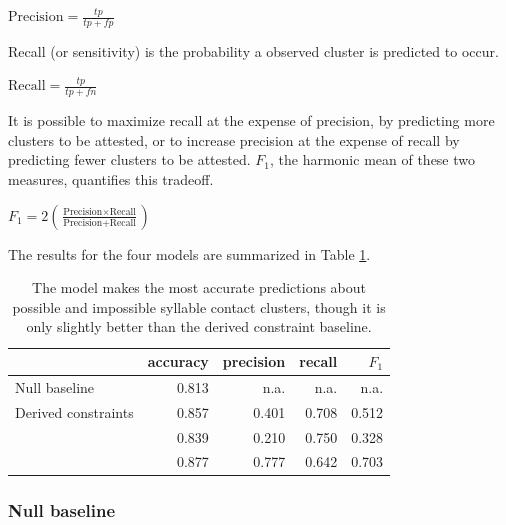 \begin{unlabeledexample}
$\displaystyle \textrm{Precision} = \frac{tp}{tp + fp}$ 
\end{unlabeledexample}

Recall (or sensitivity) is the probability a observed cluster is predicted to occur.

\begin{unlabeledexample}
$\displaystyle \textrm{Recall} = \frac{tp}{tp + fn}$
\end{unlabeledexample}

It is possible to maximize recall at the expense of precision, by predicting more clusters to be attested, or to increase precision at the expense of recall by predicting fewer clusters to be attested. $F_1$, the harmonic mean of these two measures, quantifies this tradeoff.

\begin{unlabeledexample}
$\displaystyle F_1 = 2 \left( \frac{\textrm{Precision} \times \textrm{Recall}}{\textrm{Precision} + \textrm{Recall}}\right)$
\end{unlabeledexample}

The results for the four models are summarized in Table \ref{cmresults}. 

\begin{table} \label{cmresults}
\centering
\begin{tabular}{l | r r r r}
\toprule
                          & accuracy & precision & recall & $F_1$ \\ 
\midrule
Null baseline             & 0.813    & n.a.      & n.a.   & n.a.  \\
Derived constraints       & 0.857    & 0.401     & 0.708  & 0.512 \\
\citet{Pierrehumbert1994} & 0.839    & 0.210     & 0.750  & 0.328 \\
\citet{Hayes2008a}        & 0.877    & 0.777     & 0.642  & 0.703 \\
\bottomrule
\end{tabular}
\caption{The \citeauthor{Hayes2008a} model makes the most accurate predictions about possible and impossible syllable contact clusters, though it is only slightly better than the derived constraint baseline.}
\end{table}

\subsubsection{Null baseline}

